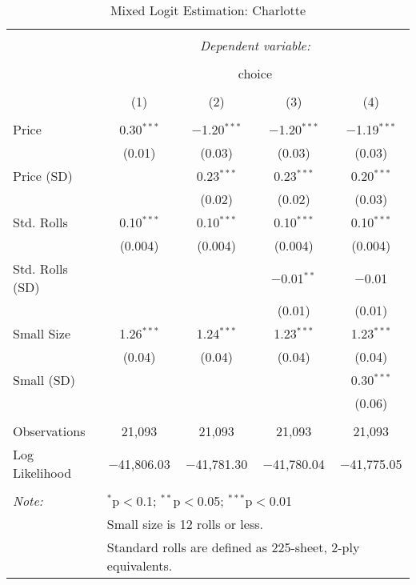 
\begin{table}[!htbp] \centering 
  \caption{Mixed Logit Estimation: Charlotte} 
  \label{tab:mnlCharlotteRandCoefNoObsHet} 
\begin{tabular}{@{\extracolsep{5pt}}lcccc} 
\\[-1.8ex]\hline 
\hline \\[-1.8ex] 
 & \multicolumn{4}{c}{\textit{Dependent variable:}} \\ 
\cline{2-5} 
\\[-1.8ex] & \multicolumn{4}{c}{choice} \\ 
\\[-1.8ex] & (1) & (2) & (3) & (4)\\ 
\hline \\[-1.8ex] 
 Price & 0.30$^{***}$ & $-$1.20$^{***}$ & $-$1.20$^{***}$ & $-$1.19$^{***}$ \\ 
  & (0.01) & (0.03) & (0.03) & (0.03) \\ 
  Price (SD) &  & 0.23$^{***}$ & 0.23$^{***}$ & 0.20$^{***}$ \\ 
  &  & (0.02) & (0.02) & (0.03) \\ 
  Std. Rolls & 0.10$^{***}$ & 0.10$^{***}$ & 0.10$^{***}$ & 0.10$^{***}$ \\ 
  & (0.004) & (0.004) & (0.004) & (0.004) \\ 
  Std. Rolls (SD) &  &  & $-$0.01$^{**}$ & $-$0.01 \\ 
  &  &  & (0.01) & (0.01) \\ 
  Small Size & 1.26$^{***}$ & 1.24$^{***}$ & 1.23$^{***}$ & 1.23$^{***}$ \\ 
  & (0.04) & (0.04) & (0.04) & (0.04) \\ 
  Small (SD) &  &  &  & 0.30$^{***}$ \\ 
  &  &  &  & (0.06) \\ 
 \hline \\[-1.8ex] 
Observations & 21,093 & 21,093 & 21,093 & 21,093 \\ 
Log Likelihood & $-$41,806.03 & $-$41,781.30 & $-$41,780.04 & $-$41,775.05 \\ 
\hline 
\hline \\[-1.8ex] 
\textit{Note:}  & \multicolumn{4}{l}{$^{*}$p$<$0.1; $^{**}$p$<$0.05; $^{***}$p$<$0.01} \\ 
 & \multicolumn{4}{l}{Small size is 12 rolls or less.} \\ 
 & \multicolumn{4}{l}{Standard rolls are defined as 225-sheet, 2-ply equivalents.} \\ 
\end{tabular} 
\end{table} 
